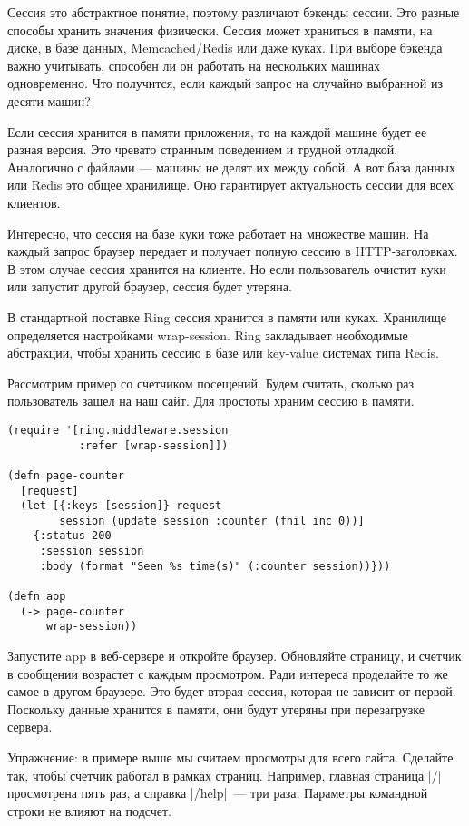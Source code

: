 Сессия это абстрактное понятие, поэтому различают бэкенды сессии. Это разные
способы хранить значения физически. Сессия может храниться в памяти, на диске, в
базе данных, Memcached/Redis или даже куках. При выборе бэкенда важно учитывать,
способен ли он работать на нескольких машинах одновременно. Что получится, если
каждый запрос на случайно выбранной из десяти машин?

Если сессия хранится в памяти приложения, то на каждой машине будет ее разная
версия. Это чревато странным поведением и трудной отладкой. Аналогично с файлами
— машины не делят их между собой. А вот база данных или Redis это общее
хранилище. Оно гарантирует актуальность сессии для всех клиентов.

Интересно, что сессия на базе куки тоже работает на множестве машин. На каждый
запрос браузер передает и получает полную сессию в HTTP-заголовках. В этом
случае сессия хранится на клиенте. Но если пользователь очистит куки или
запустит другой браузер, сессия будет утеряна.

В стандартной поставке Ring сессия хранится в памяти или куках. Хранилище
определяется настройками wrap-session. Ring закладывает необходимые абстракции,
чтобы хранить сессию в базе или key-value системах типа Redis.

Рассмотрим пример со счетчиком посещений. Будем считать, сколько раз
пользователь зашел на наш сайт. Для простоты храним сессию в памяти.

\begin{verbatim}
(require '[ring.middleware.session
           :refer [wrap-session]])

(defn page-counter
  [request]
  (let [{:keys [session]} request
        session (update session :counter (fnil inc 0))]
    {:status 200
     :session session
     :body (format "Seen %s time(s)" (:counter session))}))

(defn app
  (-> page-counter
      wrap-session))
\end{verbatim}

Запустите app в веб-сервере и откройте браузер. Обновляйте страницу, и счетчик в
сообщении возрастет с каждым просмотром. Ради интереса проделайте то же самое в
другом браузере. Это будет вторая сессия, которая не зависит от
первой. Поскольку данные хранится в памяти, они будут утеряны при перезагрузке
сервера.

Упражнение: в примере выше мы считаем просмотры для всего сайта. Сделайте так,
чтобы счетчик работал в рамках страниц. Например, главная страница \spverb|/|
просмотрена пять раз, а справка \spverb|/help|~--- три раза. Параметры командной строки
не влияют на подсчет.

